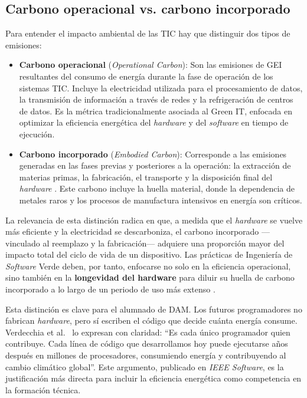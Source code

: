 \subsection{Carbono operacional vs. carbono incorporado}
\label{sec:carbono-incorporado}


Para entender el impacto ambiental de las TIC hay que distinguir dos tipos de emisiones:


\begin{itemize}
\item \textbf{Carbono operacional} (\textit{Operational Carbon}): Son las emisiones de GEI resultantes del consumo de energía durante la fase de operación de los sistemas TIC. Incluye la electricidad utilizada para el procesamiento de datos, la transmisión de información a través de redes y la refrigeración de centros de datos. Es la métrica tradicionalmente asociada al Green IT, enfocada en optimizar la eficiencia energética del \textit{hardware} y del \textit{software} en tiempo de ejecución.
\end{itemize}


\begin{itemize}
\item \textbf{Carbono incorporado} (\textit{Embodied Carbon}): Corresponde a las emisiones generadas en las fases previas y posteriores a la operación: la extracción de materias primas, la fabricación, el transporte y la disposición final del \textit{hardware} \cite{belkhir2018assessing}. Este carbono incluye la huella material, donde la dependencia de metales raros y los procesos de manufactura intensivos en energía son críticos.
\end{itemize}


La relevancia de esta distinción radica en que, a medida que el \textit{hardware} se vuelve más eficiente y la electricidad se descarboniza, el carbono incorporado —vinculado al reemplazo y la fabricación— adquiere una proporción mayor del impacto total del ciclo de vida de un dispositivo. Las prácticas de Ingeniería de \textit{Software} Verde deben, por tanto, enfocarse no solo en la eficiencia operacional, sino también en la \textbf{longevidad del hardware} para diluir su huella de carbono incorporado a lo largo de un periodo de uso más extenso \cite{verdecchia2021green}.


Esta distinción es clave para el alumnado de DAM. Los futuros programadores no fabrican \textit{hardware}, pero sí escriben el código que decide cuánta energía consume. Verdecchia et al.~\cite{verdecchia2021green} lo expresan con claridad: ``Es cada único programador quien contribuye. Cada línea de código que desarrollamos hoy puede ejecutarse años después en millones de procesadores, consumiendo energía y contribuyendo al cambio climático global''. Este argumento, publicado en \textit{IEEE Software}, es la justificación más directa para incluir la eficiencia energética como competencia en la formación técnica.


